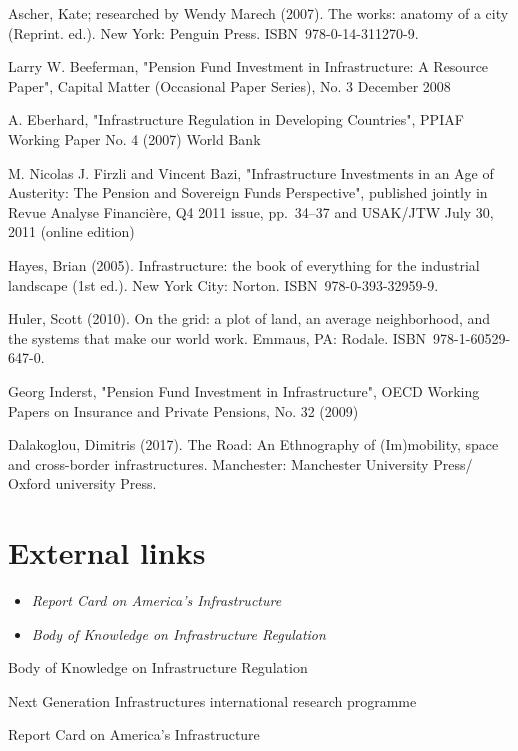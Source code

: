 Ascher, Kate; researched by Wendy Marech (2007). The works: anatomy of a
city (Reprint. ed.). New York: Penguin Press. ISBN~978-0-14-311270-9.

Larry W. Beeferman, "Pension Fund Investment in Infrastructure: A
Resource Paper", Capital Matter (Occasional Paper Series), No. 3
December 2008

A. Eberhard, "Infrastructure Regulation in Developing Countries", PPIAF
Working Paper No. 4 (2007) World Bank

M. Nicolas J. Firzli and Vincent Bazi, "Infrastructure Investments in an
Age of Austerity: The Pension and Sovereign Funds Perspective",
published jointly in Revue Analyse Financière, Q4 2011 issue, pp.~34--37
and USAK/JTW July 30, 2011 (online edition)

Hayes, Brian (2005). Infrastructure: the book of everything for the
industrial landscape (1st ed.). New York City: Norton.
ISBN~978-0-393-32959-9.

Huler, Scott (2010). On the grid: a plot of land, an average
neighborhood, and the systems that make our world work. Emmaus, PA:
Rodale. ISBN~978-1-60529-647-0.

Georg Inderst, "Pension Fund Investment in Infrastructure", OECD Working
Papers on Insurance and Private Pensions, No. 32 (2009)

Dalakoglou, Dimitris (2017). The Road: An Ethnography of (Im)mobility,
space and cross-border infrastructures. Manchester: Manchester
University Press/ Oxford university Press.

\section{External links}\label{external-links}

\begin{itemize}
\item
  \emph{Report Card on America's Infrastructure}
\item
  \emph{Body of Knowledge on Infrastructure Regulation}
\end{itemize}

Body of Knowledge on Infrastructure Regulation

Next Generation Infrastructures international research programme

Report Card on America's Infrastructure
